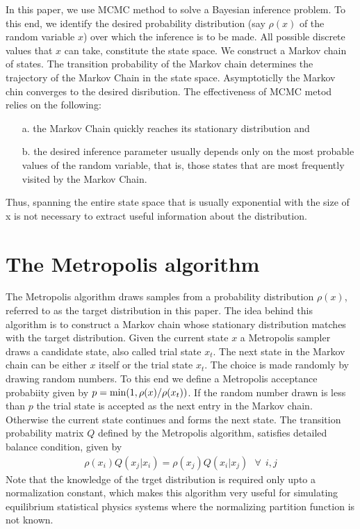 \documentclass[pre,12pt,aps]{revtex4}
\begin{document}
In this paper, we use MCMC method to solve 
a Bayesian inference problem.  To this end, we identify 
the desired probability distribution (say $\rho (x)$ of the random 
variable $x$) over which the inference is to be made. 
All possible discrete values that $x$ can take, constitute the state space.
We construct a Markov chain of states.
The 
transition probability of the Markov chain determines 
the trajectory of the Markov Chain in the state space.
Asymptoticlly the Markov chin converges to the desired disribution. 
The effectiveness of MCMC metod relies on the following:
\begin{itemize}
\item[a.]
the Markov Chain quickly reaches its stationary distribution
and
\item[b.]
the desired inference parameter usually depends only 
on the most probable values of the random variable, 
that is, those states that are most frequently  visited by the Markov Chain.
\end{itemize}
Thus, spanning the entire state space that is 
usually exponential with the size of x is not 
necessary to extract useful information about the 
distribution.

\section{The Metropolis algorithm}
The Metropolis algorithm \cite{Metropolis} draws samples 
from a probability distribution $\rho (x)$, referred to as the 
target distribution in this paper. The idea behind this 
algorithm is to construct a Markov chain whose stationary 
distribution matches with the target distribution. 
Given the current state $x$
 a Metropolis sampler draws  
a candidate state, also called trial state $x_t$.
The next state in the Markov chain can be either $x$ itself or 
the trial state $x_t$. The choice is made randomly by drawing random
numbers. To this end we define a Metropolis acceptance probabiity
given by $p={\rm min}(1,\rho(x)/\rho(x_t))$. If the random number 
drawn is less than $p$ the trial state is accepted as the next entry
in the Markov chain. Otherwise the current state continues and forms the 
next state. 
The transition probability matrix $Q$ defined by 
the Metropolis algorithm,
satisfies detailed balance 
condition, given by
\begin{eqnarray}
\rho(x_i)Q(x_j\vert x_i)=\rho(x_j)Q(x_i\vert x_j)\ \ \ \forall\ \  i,j
\end{eqnarray} 									
Note that the knowledge of the trget distribution is required only upto a 
normalization  constant, which makes this algorithm 
very useful for simulating equilibrium statistical physics systems
where the normalizing partition function is not known.
\end{document}
